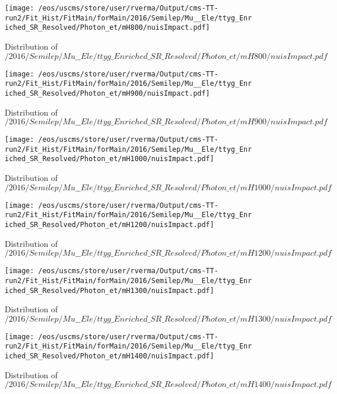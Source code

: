 \begin{figure}
\centering
\texttt{[image: /eos/uscms/store/user/rverma/Output/cms-TT-run2/Fit\_Hist/FitMain/forMain/2016/Semilep/Mu\_\_Ele/ttyg\_Enriched\_SR\_Resolved/Photon\_et/mH800/nuisImpact.pdf]}
\caption{Distribution of $/2016/Semilep/Mu\_\_Ele/ttyg\_Enriched\_SR\_Resolved/Photon\_et/mH800/nuisImpact.pdf$}
\end{figure}

\begin{figure}
\centering
\texttt{[image: /eos/uscms/store/user/rverma/Output/cms-TT-run2/Fit\_Hist/FitMain/forMain/2016/Semilep/Mu\_\_Ele/ttyg\_Enriched\_SR\_Resolved/Photon\_et/mH900/nuisImpact.pdf]}
\caption{Distribution of $/2016/Semilep/Mu\_\_Ele/ttyg\_Enriched\_SR\_Resolved/Photon\_et/mH900/nuisImpact.pdf$}
\end{figure}

\begin{figure}
\centering
\texttt{[image: /eos/uscms/store/user/rverma/Output/cms-TT-run2/Fit\_Hist/FitMain/forMain/2016/Semilep/Mu\_\_Ele/ttyg\_Enriched\_SR\_Resolved/Photon\_et/mH1000/nuisImpact.pdf]}
\caption{Distribution of $/2016/Semilep/Mu\_\_Ele/ttyg\_Enriched\_SR\_Resolved/Photon\_et/mH1000/nuisImpact.pdf$}
\end{figure}

\begin{figure}
\centering
\texttt{[image: /eos/uscms/store/user/rverma/Output/cms-TT-run2/Fit\_Hist/FitMain/forMain/2016/Semilep/Mu\_\_Ele/ttyg\_Enriched\_SR\_Resolved/Photon\_et/mH1200/nuisImpact.pdf]}
\caption{Distribution of $/2016/Semilep/Mu\_\_Ele/ttyg\_Enriched\_SR\_Resolved/Photon\_et/mH1200/nuisImpact.pdf$}
\end{figure}

\begin{figure}
\centering
\texttt{[image: /eos/uscms/store/user/rverma/Output/cms-TT-run2/Fit\_Hist/FitMain/forMain/2016/Semilep/Mu\_\_Ele/ttyg\_Enriched\_SR\_Resolved/Photon\_et/mH1300/nuisImpact.pdf]}
\caption{Distribution of $/2016/Semilep/Mu\_\_Ele/ttyg\_Enriched\_SR\_Resolved/Photon\_et/mH1300/nuisImpact.pdf$}
\end{figure}

\begin{figure}
\centering
\texttt{[image: /eos/uscms/store/user/rverma/Output/cms-TT-run2/Fit\_Hist/FitMain/forMain/2016/Semilep/Mu\_\_Ele/ttyg\_Enriched\_SR\_Resolved/Photon\_et/mH1400/nuisImpact.pdf]}
\caption{Distribution of $/2016/Semilep/Mu\_\_Ele/ttyg\_Enriched\_SR\_Resolved/Photon\_et/mH1400/nuisImpact.pdf$}
\end{figure}

